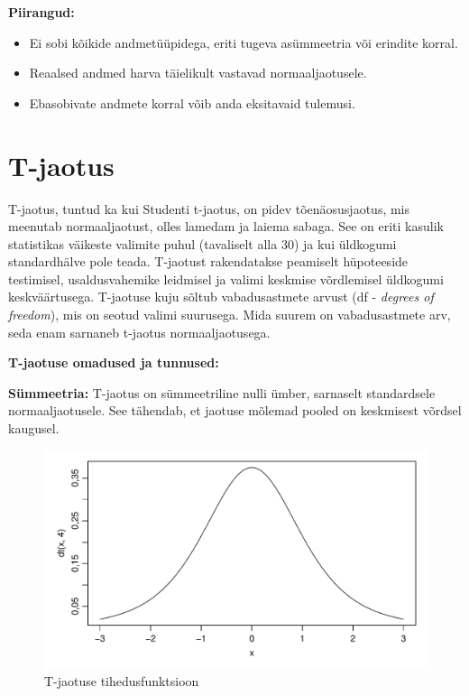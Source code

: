 \documentclass[
]{book}
\providecommand{\tightlist}{%
  \setlength{\itemsep}{0pt}\setlength{\parskip}{0pt}}
\theoremstyle{definition}
\theoremstyle{definition}
\theoremstyle{definition}
\theoremstyle{definition}
\theoremstyle{remark}
\begin{document}
\textbf{Piirangud:}

\begin{itemize}
\tightlist
\item
  Ei sobi kõikide andmetüüpidega, eriti tugeva asümmeetria või erindite korral.
\item
  Reaalsed andmed harva täielikult vastavad normaaljaotusele.
\item
  Ebasobivate andmete korral võib anda eksitavaid tulemusi.
\end{itemize}

\section{T-jaotus}\label{t-jaotus}

T-jaotus, tuntud ka kui Studenti t-jaotus, on pidev tõenäosusjaotus, mis meenutab normaaljaotust, olles lamedam ja laiema sabaga. See on eriti kasulik statistikas väikeste valimite puhul (tavaliselt alla 30) ja kui üldkogumi standardhälve pole teada. T-jaotust rakendatakse peamiselt hüpoteeside testimisel, usaldusvahemike leidmisel ja valimi keskmise võrdlemisel üldkogumi keskväärtusega. T-jaotuse kuju sõltub vabadusastmete arvust (df - \emph{degrees of freedom}), mis on seotud valimi suurusega. Mida suurem on vabadusastmete arv, seda enam sarnaneb t-jaotus normaaljaotusega.

\textbf{T-jaotuse omadused ja tunnused:}

\textbf{Sümmeetria:} T-jaotus on sümmeetriline nulli ümber, sarnaselt standardsele normaaljaotusele. See tähendab, et jaotuse mõlemad pooled on keskmisest võrdsel kaugusel.

\begin{figure}[H]
\includegraphics[width=0.8\linewidth]{_main_files/figure-latex/unnamed-chunk-38-1} \caption{T-jaotuse tihedusfunktsioon}\label{fig:unnamed-chunk-38}
\end{figure}
\end{document}
